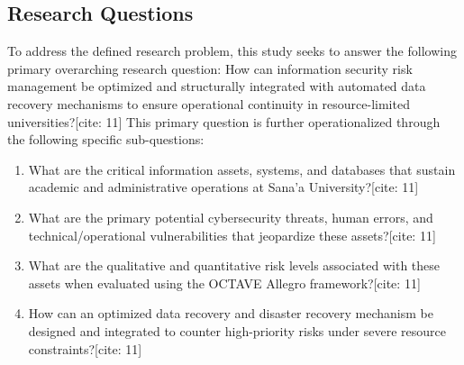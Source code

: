 \documentclass[journal,onecolumn,12pt,twoside]{IEEEtran}
\begin{document}
	\subsection{Research Questions}
	\label{subsec:questions}
	To address the defined research problem, this study seeks to answer the following primary overarching research question: How can information security risk management be optimized and structurally integrated with automated data recovery mechanisms to ensure operational continuity in resource-limited universities?[cite: 11] This primary question is further operationalized through the following specific sub-questions:
	\begin{enumerate}
		\item What are the critical information assets, systems, and databases that sustain academic and administrative operations at Sana'a University?[cite: 11]
		\item What are the primary potential cybersecurity threats, human errors, and technical/operational vulnerabilities that jeopardize these assets?[cite: 11]
		\item What are the qualitative and quantitative risk levels associated with these assets when evaluated using the OCTAVE Allegro framework?[cite: 11]
		\item How can an optimized data recovery and disaster recovery mechanism be designed and integrated to counter high-priority risks under severe resource constraints?[cite: 11]
	\end{enumerate}
	
\end{document}
